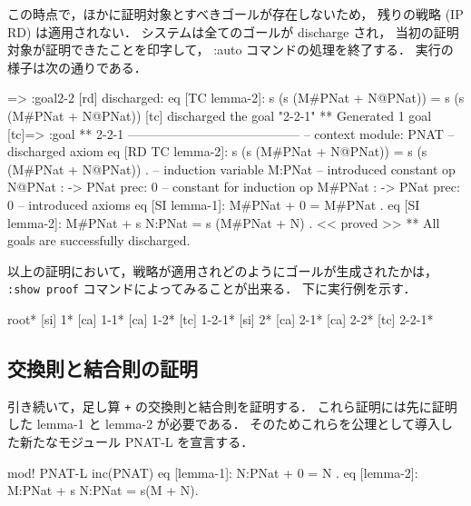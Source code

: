 \documentclass[a4paper,oneside,10pt,here]{memoir}
\newenvironment{vvtm}%
{\parskip=0pt\lineskip=0pt\begin{center}\begin{minipage}{0.8\textwidth}\begin{snugshade}}%
  {\end{snugshade}\end{minipage}\end{center}}
\begin{document}
この時点で，ほかに証明対象とすべきゴールが存在しないため，
残りの戦略 (IP RD) は適用されない．
システムは全てのゴールが discharge され，
当初の証明対象が証明できたことを印字して，
:auto コマンドの処理を終了する．
実行の様子は次の通りである．

\begin{vvtm}
\begin{simplev}
[tc]=> :goal{2-2}
[rd] discharged: 
  eq [TC lemma-2]: s (s (M#PNat + N@PNat))
      = s (s (M#PNat + N@PNat))
[tc] discharged the goal "2-2-1"
** Generated 1 goal
[tc]=>
:goal { ** 2-2-1 -----------------------------------------
  -- context module: PNAT
  -- discharged axiom
    eq [RD TC lemma-2]: s (s (M#PNat + N@PNat))
        = s (s (M#PNat + N@PNat)) .
  -- induction variable
    M:PNat
  -- introduced constant
    op N@PNat : -> PNat { prec: 0 }
  -- constant for induction
    op M#PNat : -> PNat { prec: 0 }
  -- introduced axioms
    eq [SI lemma-1]: M#PNat + 0 = M#PNat .
    eq [SI lemma-2]: M#PNat + s N:PNat = s (M#PNat + N) .
} << proved >>
** All goals are successfully discharged.

  \end{simplev}
\end{vvtm}

以上の証明において，戦略が適用されどのようにゴールが生成されたかは，
\verb|:show proof| コマンドによってみることが出来る．
下に実行例を示す．

\begin{vvtm}
  \begin{simplev}
root*
[si]  1*
[ca]  1-1*
[ca]  1-2*
[tc]  1-2-1*
[si]  2*
[ca]  2-1*
[ca]  2-2*
[tc]  2-2-1*
  \end{simplev}
\end{vvtm}

\subsection{交換則と結合則の証明}
引き続いて，足し算 \texttt{+} の交換則と結合則を証明する．
これら証明には先に証明した lemma-1 と lemma-2 が必要である．
そのためこれらを公理として導入した新たなモジュール PNAT-L を宣言する．

\begin{vvtm}
  \begin{simplev}
mod! PNAT-L {
  inc(PNAT)
  eq [lemma-1]: N:PNat + 0 = N .
  eq [lemma-2]: M:PNat + s N:PNat = s(M + N). 
}
  \end{simplev}
\end{vvtm}
\end{document}
